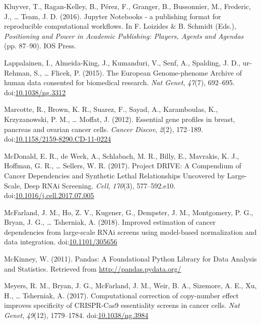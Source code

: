 \documentclass[man,floatsintext]{apa6}
\begin{document}
\hypertarget{ref-kluyver2016}{}
Kluyver, T., Ragan-Kelley, B., Pérez, F., Granger, B., Bussonnier, M.,
Frederic, J., \ldots{} Team, J. D. (2016). Jupyter Notebooks - a
publishing format for reproducible computational workflows. In F.
Loizides \& B. Schmidt (Eds.), \emph{Positioning and Power in Academic
Publishing: Players, Agents and Agendas} (pp. 87--90). IOS Press.

\hypertarget{ref-lappalainen2015}{}
Lappalainen, I., Almeida-King, J., Kumanduri, V., Senf, A., Spalding, J.
D., ur-Rehman, S., \ldots{} Flicek, P. (2015). The European
Genome-phenome Archive of human data consented for biomedical research.
\emph{Nat Genet}, \emph{47}(7), 692--695.
doi:\href{https://doi.org/10.1038/ng.3312}{10.1038/ng.3312}

\hypertarget{ref-marcotte2012}{}
Marcotte, R., Brown, K. R., Suarez, F., Sayad, A., Karamboulas, K.,
Krzyzanowski, P. M., \ldots{} Moffat, J. (2012). Essential gene profiles
in breast, pancreas and ovarian cancer cells. \emph{Cancer Discov},
\emph{2}(2), 172--189.
doi:\href{https://doi.org/10.1158/2159-8290.CD-11-0224}{10.1158/2159-8290.CD-11-0224}

\hypertarget{ref-mcdonald2017}{}
McDonald, E. R., de Weck, A., Schlabach, M. R., Billy, E., Mavrakis, K.
J., Hoffman, G. R., \ldots{} Sellers, W. R. (2017). Project DRIVE: A
Compendium of Cancer Dependencies and Synthetic Lethal Relationships
Uncovered by Large-Scale, Deep RNAi Screening. \emph{Cell},
\emph{170}(3), 577--592.e10.
doi:\href{https://doi.org/10.1016/j.cell.2017.07.005}{10.1016/j.cell.2017.07.005}

\hypertarget{ref-mcfarland2018}{}
McFarland, J. M., Ho, Z. V., Kugener, G., Dempster, J. M., Montgomery,
P. G., Bryan, J. G., \ldots{} Tsherniak, A. (2018). Improved estimation
of cancer dependencies from large-scale RNAi screens using model-based
normalization and data integration.
doi:\href{https://doi.org/10.1101/305656}{10.1101/305656}

\hypertarget{ref-mckinney2011}{}
McKinney, W. (2011). Pandas: A Foundational Python Library for Data
Analysis and Statistics. Retrieved from \url{http://pandas.pydata.org/}

\hypertarget{ref-meyers2017}{}
Meyers, R. M., Bryan, J. G., McFarland, J. M., Weir, B. A., Sizemore, A.
E., Xu, H., \ldots{} Tsherniak, A. (2017). Computational correction of
copy-number effect improves specificity of CRISPR-Cas9 essentiality
screens in cancer cells. \emph{Nat Genet}, \emph{49}(12), 1779--1784.
doi:\href{https://doi.org/10.1038/ng.3984}{10.1038/ng.3984}
\end{document}
